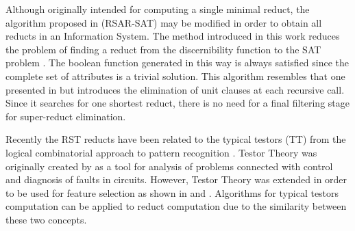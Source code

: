 \documentclass[authoryear,preprint,review,12pt]{elsarticle}
\begin{document}
  Although originally intended for computing a single minimal reduct, the algorithm proposed in \linebreak 
  \citep{Jensen14} (RSAR-SAT) may be modified in order to obtain all reducts in an Information System. 
  The method introduced in this work reduces the problem of finding a reduct from the discernibility function 
  to the SAT problem \citep{Davis62}. The boolean function generated in this way is always satisfied since the
  complete set of attributes is a trivial solution. This algorithm resembles that one presented in \citep{Starzyk99}
  but introduces the elimination of unit clauses at each recursive call. Since it searches for one shortest
  reduct, there is no need for a final filtering stage for super-reduct elimination.
     	
  Recently the RST reducts have been related to the typical testors (TT) from the logical combinatorial approach 
  to pattern recognition \citep{Lazo15}. Testor Theory was originally created by \cite{Cheguis55} as a tool for 
  analysis of problems connected with control and diagnosis of faults in circuits. 
  However, Testor Theory was extended in order to be used for feature selection as shown in \citep{Ruiz08} and 
  \citep{Martinez01}. Algorithms for typical testors computation can be applied to reduct computation due to the 
  similarity between these two concepts. 
  
\end{document}
